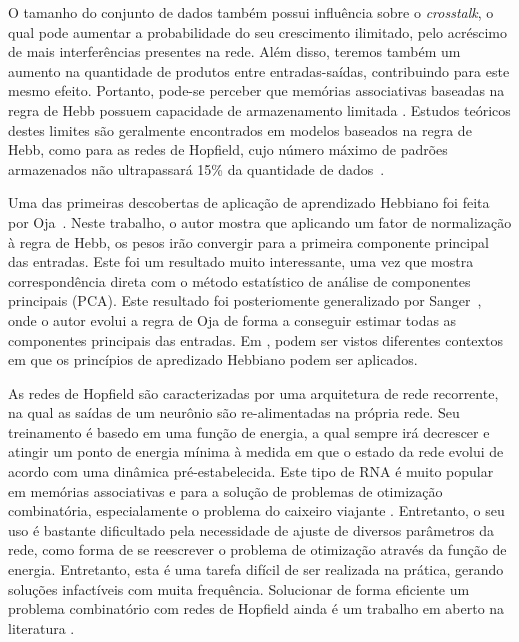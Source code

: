 \documentclass[conference]{IEEEtran}
\begin{document}
	O tamanho do conjunto de dados também possui influência sobre o \textit{crosstalk}, o qual pode aumentar a probabilidade do seu crescimento ilimitado, pelo acréscimo de mais interferências presentes na rede. Além disso, teremos também um aumento na quantidade de produtos entre entradas-saídas, contribuindo para este mesmo efeito. Portanto, pode-se perceber que memórias associativas baseadas na regra de Hebb possuem capacidade de armazenamento limitada \cite{jain1996artificial}. Estudos teóricos destes limites são geralmente encontrados em modelos baseados na regra de Hebb, como para as redes de Hopfield, cujo número máximo de padrões armazenados não ultrapassará 15\% da quantidade de dados~\cite{mceliece1987capacity}.
	
	Uma das primeiras descobertas de aplicação de aprendizado Hebbiano foi feita por Oja~\cite{oja1982simplified}. Neste trabalho, o autor mostra que aplicando um fator de normalização à regra de Hebb, os pesos irão convergir para a primeira componente principal das entradas. Este foi um resultado muito interessante, uma vez que mostra correspondência direta com o método estatístico de análise de componentes principais (PCA). Este resultado foi posteriomente generalizado por Sanger~\cite{sanger1989optimal}, onde o autor evolui a regra de Oja de forma a conseguir estimar todas as componentes principais das entradas. Em \cite{linsker1988self}, podem ser vistos diferentes contextos em que os princípios de apredizado Hebbiano podem ser aplicados.
	
	As redes de Hopfield \cite{hopfield1982neural} são caracterizadas por uma arquitetura de rede recorrente, na qual as saídas de um neurônio são re-alimentadas na própria rede. Seu treinamento é basedo em uma função de energia, a qual sempre irá decrescer e atingir um ponto de energia mínima à medida em que o estado da rede evolui de acordo com uma dinâmica pré-estabelecida. Este tipo de RNA é muito popular em memórias associativas e para a solução de problemas de otimização combinatória, especialamente o problema do caixeiro viajante \cite{hopfield1985neural,smith1999neural}. Entretanto, o seu uso é bastante dificultado pela necessidade de ajuste de diversos parâmetros da rede, como forma de se reescrever o problema de otimização através da função de energia. Entretanto, esta é uma tarefa difícil de ser realizada na prática, gerando soluções infactíveis com muita frequência. Solucionar de forma eficiente um problema combinatório com redes de Hopfield ainda é um trabalho em aberto na literatura \cite{zhang2014comprehensive}.
	
\end{document}
